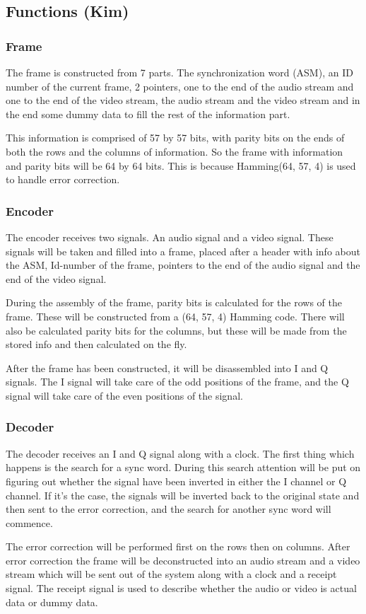 \subsection{Functions (Kim)}

\subsubsection*{Frame}
The frame is constructed from 7 parts. The synchronization word (ASM), an ID number of the current frame, 2 pointers, one to the end of the audio stream and one to the end of the video stream, the audio stream and the video stream and in the end some dummy data to fill the rest of the information part. 

This information is comprised of 57 by 57 bits, with parity bits on the ends of both the rows and the columns of information. So the frame with information and parity bits will be 64 by 64 bits. This is because Hamming(64, 57, 4) is used to handle error correction.

\subsubsection*{Encoder}
The encoder receives two signals. An audio signal and a video signal. These signals will be taken and filled into a frame, placed after a header with info about the ASM, Id-number of the frame, pointers to the end of the audio signal and the end of the video signal.

During the assembly of the frame, parity bits is calculated for the rows of the frame. These will be constructed from a (64, 57, 4) Hamming code. There will also be calculated parity bits for the columns, but these will be made from the stored info and then calculated on the fly.

After the frame has been constructed, it will be disassembled into I and Q signals. The I signal will take care of the odd positions of the frame, and the Q signal will take care of the even positions of the signal.

\subsubsection*{Decoder}
The decoder receives an I and Q signal along with a clock. The first thing which happens is the search for a sync word. During this search attention will be put on figuring out whether the signal have been inverted in either the I channel or Q channel. If it’s the case, the signals will be inverted back to the original state and then sent to the error correction, and the search for another sync word will commence. 

The error correction will be performed first on the rows then on columns. After error correction the frame will be deconstructed into an audio stream and a video stream which will be sent out of the system along with a clock and a receipt signal. The receipt signal is used to describe whether the audio or video is actual data or dummy data.
